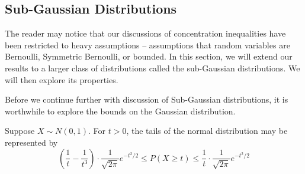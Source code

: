 
\subsection{Sub-Gaussian Distributions}
The reader may notice that our discussions of concentration inequalities have been restricted to heavy assumptions -- assumptions that random variables are Bernoulli, Symmetric Bernoulli, or bounded. In this section, we will extend our results to a larger class of distributions called the sub-Gaussian distributions. We will then explore its properties.  

Before we continue further with discussion of Sub-Gaussian distributions, it is worthwhile to explore the bounds on the Gaussian distribution. \\

\begin{tcolorbox}
\begin{proposition}
Suppose $X \sim N(0,1)$. For $t > 0$, the tails of the normal distribution may be represented by 
$$ \left(\frac{1}{t} - \frac{1}{t^3} \right) \cdot \frac{1}{\sqrt{2\pi}} e^{-t^2/2} \leq P(X \geq t) \leq \frac{1}{t} \cdot \frac{1}{\sqrt{2\pi}} e^{-t^2/2}$$
\end{proposition}
\end{tcolorbox}

